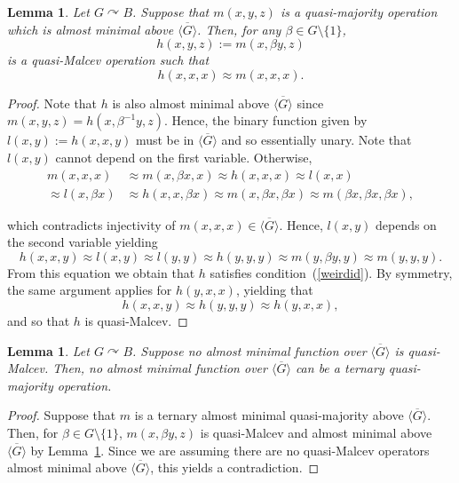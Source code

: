 \documentclass{article}
\newtheorem{lemma}[theorem]{Lemma}
\theoremstyle{remark}
\newtheorem{remark}[theorem]{Remark}
\theoremstyle{definition}
\def\acts{\curvearrowright}
\begin{document}
    \begin{lemma}\label{majtoMal}
     Let $G\acts B$. Suppose that $m(x,y,z)$ is a quasi-majority operation which is almost minimal above $\overline{\langle G \rangle}$. Then, for any $\beta\in G\setminus \{1\}$, 
\[h(x,y,z):=m(x,\beta y, z)\]
is a quasi-Malcev operation such that
\begin{equation}\label{weirdid}
  h(x,x,x)\approx m(x,x,x).  
\end{equation}
\end{lemma}
\begin{proof} Note that $h$ is also almost minimal above $\overline{\langle G \rangle}$ since $m(x,y,z)=h(x,\beta^{-1} y, z)$. Hence, the binary function given by $l(x,y):=h(x,x,y)$ must be in $\overline{\langle G \rangle}$ and so essentially unary. Note that $l(x,y)$ cannot depend on the first variable. Otherwise,
\begin{align*}
    m(x,x,x) &\approx m(x, \beta x, x)\approx h(x,x,x) \approx l(x,x)\\ \approx l(x,\beta x)&\approx 
 h(x,x,\beta  x)\approx m(x, \beta  x, \beta x)\approx m(\beta x,\beta x,\beta x),
\end{align*}

which contradicts injectivity of $m(x,x,x)\in \overline{\langle G \rangle}$. Hence, $l(x,y)$ depends on the second variable yielding
\[h(x,x,y)\approx l(x,y)\approx l(y,y)\approx  
 h(y,y,y)\approx m(y,\beta y, y)\approx m(y,y,y).\]
From this equation we obtain that $h$ satisfies condition~(\ref{weirdid}). By symmetry, the same argument applies for $h(y,x,x)$, yielding that 
\[h(x,x,y)\approx h(y,y,y)\approx h(y,x,x),\]
and so that $h$ is quasi-Malcev.
\end{proof}




\begin{lemma}\label{nomaj} Let $G\acts B$. Suppose no almost minimal function over $\overline{\langle G \rangle}$ is quasi-Malcev. Then, no almost minimal function over $\overline{\langle G \rangle}$ can be a ternary quasi-majority operation. 
\end{lemma}
\begin{proof}
Suppose that $m$ is a ternary almost minimal quasi-majority above $\overline{\langle G \rangle}$. Then, for $\beta\in G\setminus \{1\}$, $m(x,\beta y, z)$ is quasi-Malcev and almost minimal above $\overline{\langle G \rangle}$ by Lemma~\ref{majtoMal}. Since we are assuming there are no quasi-Malcev operators almost minimal above $\overline{\langle G \rangle}$, this yields a contradiction.
\end{proof}
\end{document}
